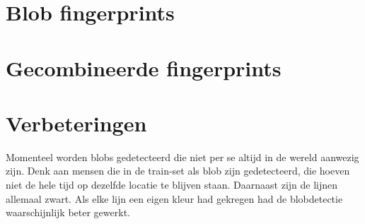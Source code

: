 \documentclass[a4paper]{article}
\begin{document}
\section{Blob fingerprints}
\section{Gecombineerde fingerprints}

\section{Verbeteringen}
Momenteel worden blobs gedetecteerd die niet per se altijd in de wereld aanwezig zijn. Denk aan mensen die in de train-set als blob zijn gedetecteerd, die hoeven niet de hele tijd op dezelfde locatie te blijven staan. Daarnaast zijn de lijnen allemaal zwart. Als elke lijn een eigen kleur had gekregen had de blobdetectie waarschijnlijk beter gewerkt.
\end{document}
